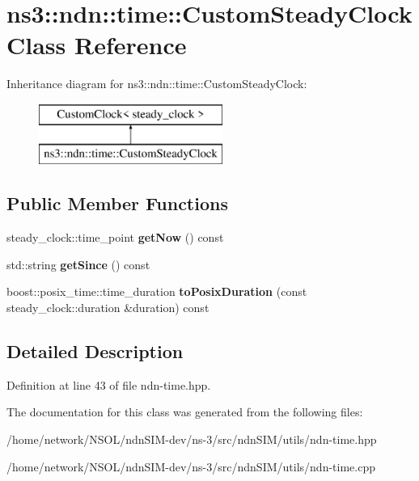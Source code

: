 \hypertarget{classns3_1_1ndn_1_1time_1_1CustomSteadyClock}{}\section{ns3\+:\+:ndn\+:\+:time\+:\+:Custom\+Steady\+Clock Class Reference}
\label{classns3_1_1ndn_1_1time_1_1CustomSteadyClock}
Inheritance diagram for ns3\+:\+:ndn\+:\+:time\+:\+:Custom\+Steady\+Clock\+:\begin{figure}[H]
\begin{center}
\leavevmode
\includegraphics[height=2.000000cm]{classns3_1_1ndn_1_1time_1_1CustomSteadyClock}
\end{center}
\end{figure}
\subsection*{Public Member Functions}
\begin{DoxyCompactItemize}
\item 
steady\+\_\+clock\+::time\+\_\+point {\bfseries get\+Now} () const\hypertarget{classns3_1_1ndn_1_1time_1_1CustomSteadyClock_a13895826b1e4ca9cd6bc247f16f6675d}{}\label{classns3_1_1ndn_1_1time_1_1CustomSteadyClock_a13895826b1e4ca9cd6bc247f16f6675d}

\item 
std\+::string {\bfseries get\+Since} () const\hypertarget{classns3_1_1ndn_1_1time_1_1CustomSteadyClock_a59e943651c909f6c43e6da68a4a76504}{}\label{classns3_1_1ndn_1_1time_1_1CustomSteadyClock_a59e943651c909f6c43e6da68a4a76504}

\item 
boost\+::posix\+\_\+time\+::time\+\_\+duration {\bfseries to\+Posix\+Duration} (const steady\+\_\+clock\+::duration \&duration) const\hypertarget{classns3_1_1ndn_1_1time_1_1CustomSteadyClock_a3452b6b0819e4bb25d13160ccb5a4739}{}\label{classns3_1_1ndn_1_1time_1_1CustomSteadyClock_a3452b6b0819e4bb25d13160ccb5a4739}

\end{DoxyCompactItemize}


\subsection{Detailed Description}


Definition at line 43 of file ndn-\/time.\+hpp.



The documentation for this class was generated from the following files\+:\begin{DoxyCompactItemize}
\item 
/home/network/\+N\+S\+O\+L/ndn\+S\+I\+M-\/dev/ns-\/3/src/ndn\+S\+I\+M/utils/ndn-\/time.\+hpp\item 
/home/network/\+N\+S\+O\+L/ndn\+S\+I\+M-\/dev/ns-\/3/src/ndn\+S\+I\+M/utils/ndn-\/time.\+cpp\end{DoxyCompactItemize}
